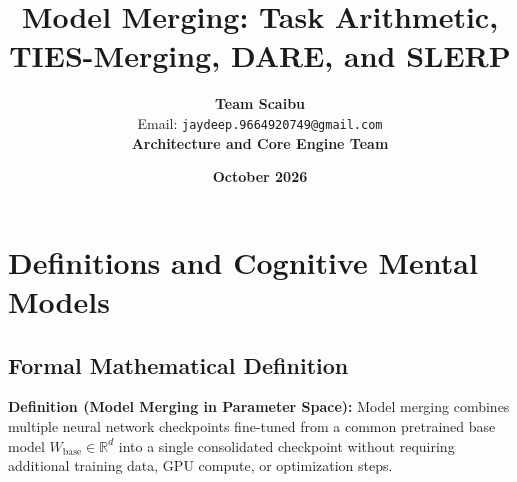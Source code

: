 \documentclass[11pt,a4paper]{article}
\title{\textbf{Model Merging: Task Arithmetic, TIES-Merging, DARE, and SLERP}}
\author{\textbf{Team Scaibu} \\ \small Email: \texttt{jaydeep.9664920749@gmail.com} \\ \small \textbf{Architecture and Core Engine Team}}
\date{\textbf{October 2026}}
\theoremstyle{definition}
\begin{document}
\maketitle

\section{Definitions and Cognitive Mental Models}

\subsection{Formal Mathematical Definition}
\textbf{Definition (Model Merging in Parameter Space):}
Model merging combines multiple neural network checkpoints fine-tuned from a common pretrained base model $W_{\text{base}} \in \mathbb{R}^d$ into a single consolidated checkpoint without requiring additional training data, GPU compute, or optimization steps.
\end{document}
